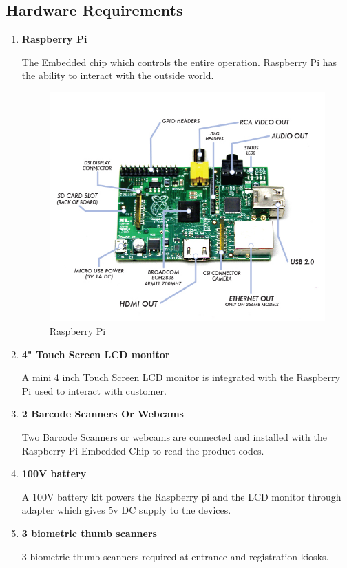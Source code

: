 \documentclass[a4paper,oneside,11pt,english]{report}
\begin{document}
	\subsection{Hardware Requirements}
	\begin{enumerate}
		\item {
			\textbf{Raspberry Pi}
			\par The Embedded chip which controls the entire operation. Raspberry Pi  has the ability to interact with the outside world.\\
			\begin{figure}[ht]
				\includegraphics[width=\linewidth]{images/raspberry-pi.jpg}
				\caption{Raspberry Pi}
			\end{figure}
		}
		\item {
			\textbf{4" Touch Screen LCD monitor}
			\par A mini 4 inch Touch Screen LCD monitor is integrated with the Raspberry Pi used to interact with customer.
		}
		\item {
			\textbf{2 Barcode Scanners Or Webcams}
			\par Two Barcode Scanners or webcams are connected and installed with the Raspberry Pi Embedded Chip to read the  product codes. 
		}
		\item {
			\textbf{100V battery}
			\par A 100V battery kit powers the Raspberry pi and the LCD monitor through adapter which gives 5v DC supply to the devices.
		}
		\item {
			\textbf{3 biometric thumb scanners}
			\par 3 biometric thumb scanners required at entrance and registration kiosks.
		}
	\end{enumerate}
\end{document}
